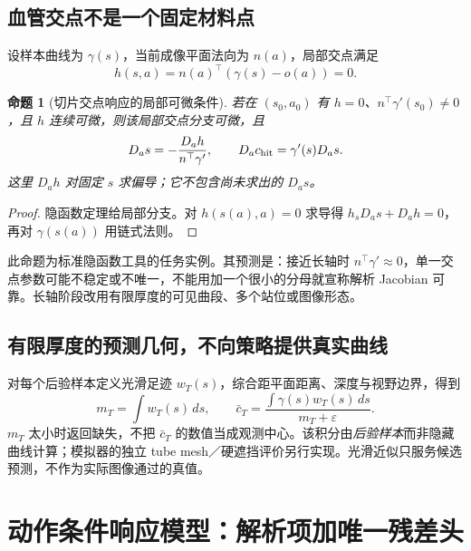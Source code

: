 \documentclass[UTF8,fontset=fandol,11pt,a4paper]{ctexart}
\theoremstyle{plain}
\newtheorem{proposition}[theorem]{命题}
\theoremstyle{definition}
\theoremstyle{remark}
\numberwithin{equation}{section}
\begin{document}
\subsection{血管交点不是一个固定材料点}
设样本曲线为 $\gamma(s)$，当前成像平面法向为 $n(a)$，局部交点满足
\begin{equation}
h(s,a)=n(a)^\top(\gamma(s)-o(a))=0.
\end{equation}
\begin{proposition}[切片交点响应的局部可微条件]
若在 $(s_0,a_0)$ 有 $h=0$、$n^\top\gamma'(s_0)\ne0$，且 $h$ 连续可微，则该局部交点分支可微，且
\begin{equation}
D_a s=-\frac{D_a h}{n^\top\gamma'},\qquad D_a c_{\rm hit}=\gamma'(s)D_a s.
\label{eq:hit}
\end{equation}
这里 $D_a h$ 对固定 $s$ 求偏导；它不包含尚未求出的 $D_a s$。
\end{proposition}
\begin{proof}隐函数定理给局部分支。对 $h(s(a),a)=0$ 求导得 $h_sD_as+D_ah=0$，再对 $\gamma(s(a))$ 用链式法则。\end{proof}

此命题为标准隐函数工具的任务实例。其预测是：接近长轴时 $n^\top\gamma'\approx0$，单一交点参数可能不稳定或不唯一，不能用加一个很小的分母就宣称解析 Jacobian 可靠。长轴阶段改用有限厚度的可见曲段、多个站位或图像形态。

\subsection{有限厚度的预测几何，不向策略提供真实曲线}
对每个后验样本定义光滑足迹 $w_T(s)$，综合距平面距离、深度与视野边界，得到
\begin{equation}
m_T=\int w_T(s)\,ds,\qquad
\bar c_T=\frac{\int\gamma(s)w_T(s)\,ds}{m_T+\varepsilon}.
\end{equation}
$m_T$ 太小时返回缺失，不把 $\bar c_T$ 的数值当成观测中心。该积分由\emph{后验样本}而非隐藏曲线计算；模拟器的独立 tube mesh／硬遮挡评价另行实现。光滑近似只服务候选预测，不作为实际图像通过的真值。

\section{动作条件响应模型：解析项加唯一残差头}
\label{sec:response}
\end{document}
